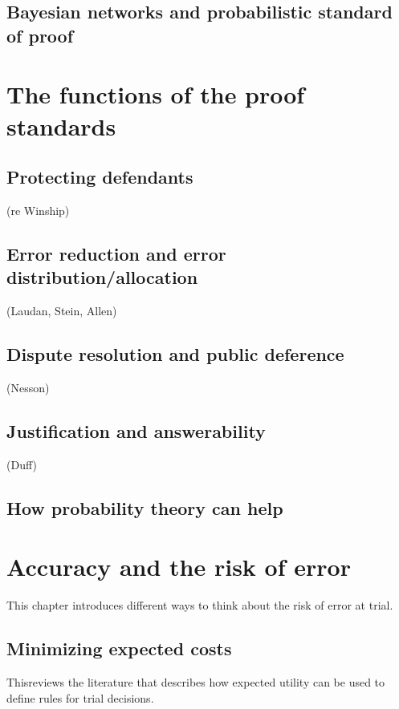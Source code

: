 \documentclass[]{book}
\begin{document}
\section{Bayesian networks and probabilistic standard of proof}

\chapter{The functions of the proof standards}

\section{Protecting defendants}

(re Winship)

\section{Error reduction and error distribution/allocation}

(Laudan, Stein, Allen)

\section{Dispute resolution and public deference}

(Nesson)

\section{Justification and answerability}

(Duff)

\section{How probability theory can help}

\chapter{Accuracy and the risk of error}

This chapter introduces different
ways to think about the risk
of error at trial.

\section{Minimizing expected costs}

Thisreviews the literature
that describes how
expected utility can be used
to define rules for trial decisions.
\end{document}
